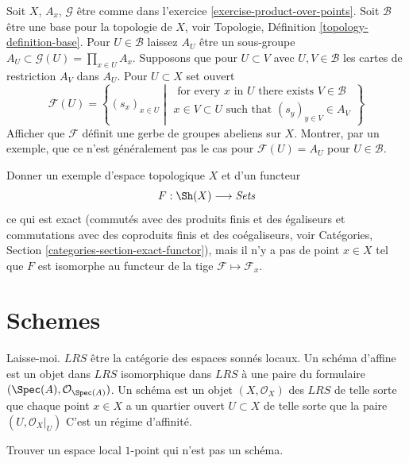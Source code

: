 \begin{exercise}
\label{exercise-modified-product-over-points}
Soit $X$, $A_x$, $\mathcal{G}$ être comme
dans l'exercice \ref{exercise-product-over-points}. Soit $\mathcal{B}$ être une
base pour la topologie de $X$, voir Topologie, Définition
\ref{topology-definition-base}. Pour $U \in \mathcal{B}$ laissez $A_U$ être
un sous-groupe $A_U \subset \mathcal{G}(U) = \prod_{x
\in U} A_x$. Supposons que pour $U \subset V$ avec
$U, V \in \mathcal{B}$ les cartes de restriction $A_V$
dans $A_U$. Pour $U \subset X$ set ouvert
$$
\mathcal{F}(U) =
\left\{
(s_x)_{x \in U}
\middle|
\begin{matrix}
\text{ for every }x\text{ in }U\text{ there exists } V \in \mathcal{B} \\
x \in V \subset U\text{ such that } (s_y)_{y \in V} \in A_V
\end{matrix}
\right\}
$$
Afficher que $\mathcal{F}$ définit une gerbe de groupes abeliens sur $X$. Montrer,
par un exemple, que ce n'est généralement pas le cas
pour $\mathcal{F}(U) = A_U$ pour $U \in \mathcal{B}$.
\end{exercise}

\begin{exercise}
\label{exercise-exact-but-not-a-stalk-functor}
Donner un exemple d'espace topologique $X$ et d'un functeur
$$
F : \Sh(X) \longrightarrow \textit{Sets}
$$
ce qui est exact (commutés avec des produits finis et des égaliseurs
et commutations avec des coproduits finis et des coégaliseurs, voir
Catégories, Section \ref{categories-section-exact-functor}), mais il n'y a pas de point $x \in
X$ tel que $F$ est isomorphe au functeur
de la tige $\mathcal{F} \mapsto \mathcal{F}_x$.
\end{exercise}




\section{Schemes}
\label{section-schemes}

\noindent
Laisse-moi. $LRS$ être la catégorie des espaces sonnés locaux. Un
schéma d'affine est un objet dans $LRS$ isomorphique dans $LRS$ à
une paire du formulaire $(\Spec(A), {\mathcal O}_{\Spec(A)})$. Un schéma est un
objet $(X,
{\mathcal O}_X)$ des $LRS$ de telle sorte que chaque point $x\in X$ a
un quartier ouvert $U \subset X$ de telle sorte que la
paire $(U, {\mathcal O}_X|_U)$ C'est un régime d'affinité.

\begin{exercise}
\label{exercise-one-point}
Trouver un espace local $1$-point qui n'est pas un schéma.
\end{exercise}

